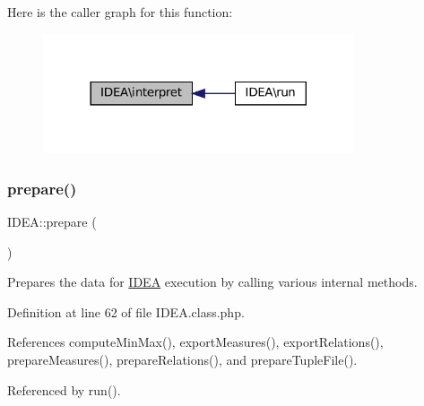 Here is the caller graph for this function\+:\nopagebreak
\begin{figure}[H]
\begin{center}
\leavevmode
\includegraphics[width=260pt]{class_i_d_e_a_a56633ba474df66fc6073aa4757097145_icgraph}
\end{center}
\end{figure}
\mbox{\label{class_i_d_e_a_af5672e1fd95ed4bacd0922478a3317f2}} 
\subsubsection{\texorpdfstring{prepare()}{prepare()}}
{\footnotesize\ttfamily I\+D\+E\+A\+::prepare (\begin{DoxyParamCaption}{ }\end{DoxyParamCaption})\hspace{0.3cm}{\ttfamily [protected]}}

Prepares the data for \hyperlink{class_i_d_e_a}{I\+D\+EA} execution by calling various internal methods. 

Definition at line 62 of file I\+D\+E\+A.\+class.\+php.



References compute\+Min\+Max(), export\+Measures(), export\+Relations(), prepare\+Measures(), prepare\+Relations(), and prepare\+Tuple\+File().



Referenced by run().

